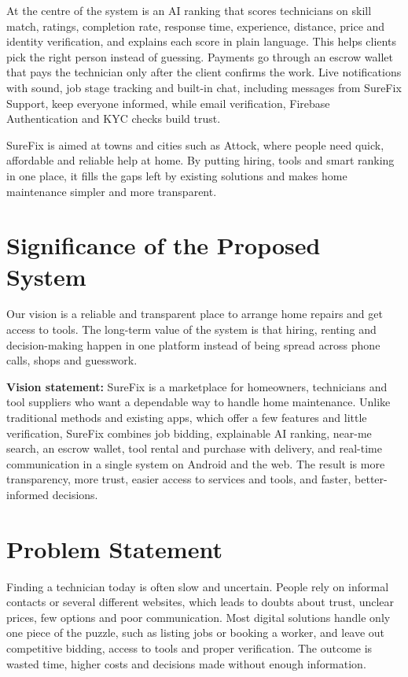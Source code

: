 \documentclass[A4paper,12pt]{report}
\theoremstyle{plain}
\theoremstyle{definition}
\theoremstyle{remark}
\numberwithin{equation}{section}
\begin{document}
At the centre of the system is an AI ranking that scores technicians on skill match, ratings, completion rate, response time, experience, distance, price and identity verification, and explains each score in plain language. This helps clients pick the right person instead of guessing. Payments go through an escrow wallet that pays the technician only after the client confirms the work. Live notifications with sound, job stage tracking and built-in chat, including messages from SureFix Support, keep everyone informed, while email verification, Firebase Authentication and KYC checks build trust.

SureFix is aimed at towns and cities such as Attock, where people need quick, affordable and reliable help at home. By putting hiring, tools and smart ranking in one place, it fills the gaps left by existing solutions and makes home maintenance simpler and more transparent.

\section{Significance of the Proposed System}
Our vision is a reliable and transparent place to arrange home repairs and get access to tools. The long-term value of the system is that hiring, renting and decision-making happen in one platform instead of being spread across phone calls, shops and guesswork.

\textbf{Vision statement:} \newline
SureFix is a marketplace for homeowners, technicians and tool suppliers who want a dependable way to handle home maintenance. Unlike traditional methods and existing apps, which offer a few features and little verification, SureFix combines job bidding, explainable AI ranking, near-me search, an escrow wallet, tool rental and purchase with delivery, and real-time communication in a single system on Android and the web. The result is more transparency, more trust, easier access to services and tools, and faster, better-informed decisions.

\section{Problem Statement}
Finding a technician today is often slow and uncertain. People rely on informal contacts or several different websites, which leads to doubts about trust, unclear prices, few options and poor communication. Most digital solutions handle only one piece of the puzzle, such as listing jobs or booking a worker, and leave out competitive bidding, access to tools and proper verification. The outcome is wasted time, higher costs and decisions made without enough information.
\end{document}
